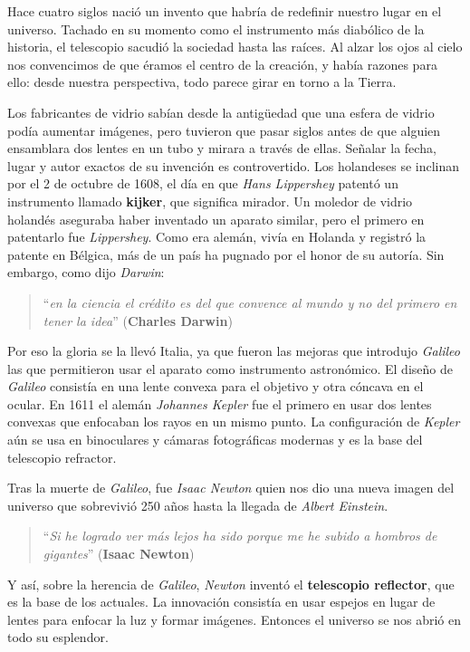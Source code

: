 \bigskip
Hace cuatro siglos nació un invento que habría de redefinir nuestro lugar en el universo. Tachado en su momento como el instrumento más diabólico de la historia, el telescopio sacudió la sociedad hasta las raíces. Al alzar los ojos al cielo nos convencimos de que éramos el centro de la creación, y había razones para ello: desde nuestra perspectiva, todo parece girar en torno a la Tierra.\cite{ETL}

\bigskip
Los fabricantes de vidrio sabían desde la antigüedad que una esfera de vidrio podía aumentar imágenes, pero tuvieron que pasar siglos antes de que alguien ensamblara dos lentes en un tubo y mirara a través de ellas. Señalar la fecha, lugar y autor exactos de su invención es controvertido. Los holandeses se inclinan por el 2 de octubre de 1608, el día en que \textit{Hans Lippershey} patentó un instrumento llamado \textbf{kijker}, que significa mirador. Un moledor de vidrio holandés aseguraba haber inventado un aparato similar, pero el primero en patentarlo fue \textit{Lippershey}. Como era alemán, vivía en Holanda y registró la patente en Bélgica, más de un país ha pugnado por el honor de su autoría. Sin embargo, como dijo \textit{Darwin}:
\begin{quote}``\textit{en la ciencia el crédito es del que convence al mundo y no del primero en tener la idea}''
\newline(\textbf{Charles Darwin})
\end{quote}
Por eso la gloria se la llevó Italia, ya que fueron las mejoras que introdujo \textit{Galileo} las que permitieron usar el aparato como instrumento astronómico. El diseño de \textit{Galileo} consistía en una lente convexa para el objetivo y otra cóncava en el ocular. En 1611 el alemán \textit{Johannes Kepler} fue el primero en usar dos lentes convexas que enfocaban los rayos en un mismo punto. La configuración de \textit{Kepler} aún se usa en binoculares y cámaras fotográficas modernas y es la base del telescopio refractor.

\bigskip
Tras la muerte de \textit{Galileo}, fue \textit{Isaac Newton} quien nos dio una nueva imagen del universo que sobrevivió 250 años hasta la llegada de \textit{Albert Einstein}.

\begin{quote}``\textit{Si he logrado ver más lejos ha sido porque me he subido a hombros de gigantes}''
\newline(\textbf{Isaac Newton})
\end{quote}

Y así, sobre la herencia de \textit{Galileo}, \textit{Newton} inventó el \textbf{telescopio reflector}, que es la base de los actuales. La innovación consistía en usar espejos en lugar de lentes para enfocar la luz y formar imágenes. Entonces el universo se nos abrió en todo su esplendor.

